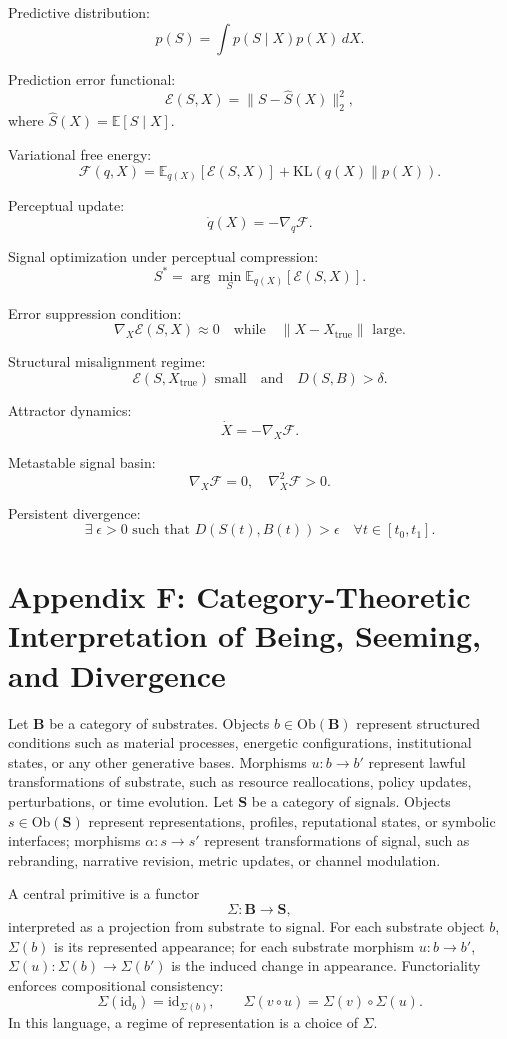 \documentclass[11pt]{article}
\begin{document}
Predictive distribution:
\[
p(S) = \int p(S \mid X)p(X)\, dX.
\]

Prediction error functional:
\[
\mathcal{E}(S,X) = \| S - \hat{S}(X) \|_2^2,
\]
where $\hat{S}(X) = \mathbb{E}[S \mid X]$.

Variational free energy:
\[
\mathcal{F}(q,X)
=
\mathbb{E}_{q(X)}[\mathcal{E}(S,X)]
+
\mathrm{KL}(q(X)\|p(X)).
\]

Perceptual update:
\[
\dot{q}(X) = - \nabla_q \mathcal{F}.
\]

Signal optimization under perceptual compression:
\[
S^* = \arg\min_S \mathbb{E}_{q(X)}[\mathcal{E}(S,X)].
\]

Error suppression condition:
\[
\nabla_X \mathcal{E}(S,X) \approx 0
\quad \text{while} \quad
\|X - X_{\text{true}}\| \text{ large}.
\]

Structural misalignment regime:
\[
\mathcal{E}(S,X_{\text{true}}) \text{ small}
\quad \text{and} \quad
D(S,B) > \delta.
\]

Attractor dynamics:
\[
\dot{X} = - \nabla_X \mathcal{F}.
\]

Metastable signal basin:
\[
\nabla_X \mathcal{F} = 0,
\quad
\nabla_X^2 \mathcal{F} > 0.
\]

Persistent divergence:
\[
\exists \; \epsilon > 0
\text{ such that }
D(S(t),B(t)) > \epsilon
\quad \forall t \in [t_0,t_1].
\]

\section{Appendix F: Category-Theoretic Interpretation of Being, Seeming, and Divergence}

Let $\mathbf{B}$ be a category of substrates. Objects $b \in \mathrm{Ob}(\mathbf{B})$ represent structured conditions such as material processes, energetic configurations, institutional states, or any other generative bases. Morphisms $u:b\to b'$ represent lawful transformations of substrate, such as resource reallocations, policy updates, perturbations, or time evolution. Let $\mathbf{S}$ be a category of signals. Objects $s \in \mathrm{Ob}(\mathbf{S})$ represent representations, profiles, reputational states, or symbolic interfaces; morphisms $\alpha:s\to s'$ represent transformations of signal, such as rebranding, narrative revision, metric updates, or channel modulation.

A central primitive is a functor
\[
\Sigma : \mathbf{B} \to \mathbf{S},
\]
interpreted as a projection from substrate to signal. For each substrate object $b$, $\Sigma(b)$ is its represented appearance; for each substrate morphism $u:b\to b'$, $\Sigma(u):\Sigma(b)\to\Sigma(b')$ is the induced change in appearance. Functoriality enforces compositional consistency:
\[
\Sigma(\mathrm{id}_b)=\mathrm{id}_{\Sigma(b)}, 
\qquad 
\Sigma(v\circ u)=\Sigma(v)\circ \Sigma(u).
\]
In this language, a regime of representation is a choice of $\Sigma$.
\end{document}
